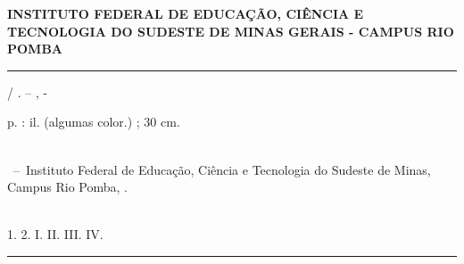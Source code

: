 \documentclass[
	12pt,				%
	openright,			%
	oneside,			%
	a4paper,			%
	english,			%
	french,				%
	spanish,			%
	brazil,				%
	]{abntex2}
\begin{document}
\frenchspacing 


\begin{center}
\textbf{ 
INSTITUTO FEDERAL DE EDUCAÇÃO, CIÊNCIA E TECNOLOGIA DO SUDESTE DE MINAS GERAIS - CAMPUS RIO POMBA}
\end{center}

\imprimircapa

\imprimirfolhaderosto*


%
%     
\begin{fichacatalografica}
	\vspace*{\fill}					%
	\hrule							%
	\begin{center}					%
	\begin{minipage}[c]{12.5cm}		%
	
	\imprimirautor
	
	\hspace{0.5cm} \imprimirtitulo  / \imprimirautor. --
	\imprimirlocal, \imprimirdata-
	
	\hspace{0.5cm} \pageref{LastPage} p. : il. (algumas color.) ; 30 cm.\\
	
	\hspace{0.5cm} \imprimirorientadorRotulo~\imprimirorientador\\
	
	\hspace{0.5cm}
	\parbox[t]{\textwidth}{\imprimirtipotrabalho~--~Instituto Federal de Educação, Ciência e Tecnologia do Sudeste de Minas, Campus Rio Pomba,
	\imprimirdata.}\\
	
	\hspace{0.5cm}
		1. 
		2. 
		I. 
		II.
		III.
		IV. \\ 			
	
	\hspace{8.75cm} %
	
	\end{minipage}
	\end{center}
	\hrule
\end{fichacatalografica}
\end{document}
